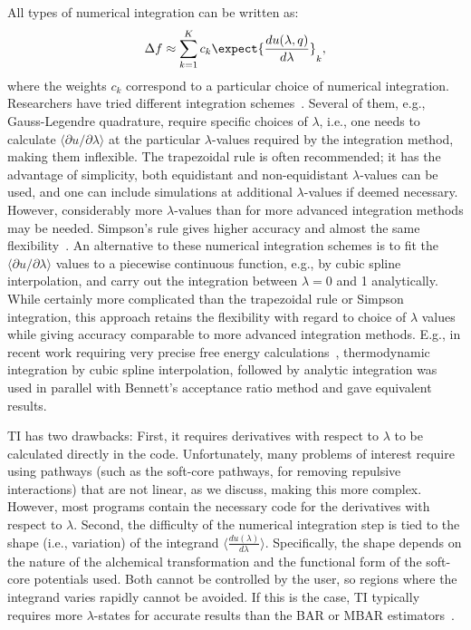 All types of numerical integration can be written as:
\[ \Delta f \approx \sum_{k=1}^{K} c_k
\expect{\frac{du(\lambda,q)}{d\lambda}}_{k}, \] where the weights $c_k$ correspond to a particular choice of numerical integration.
Researchers have tried different integration schemes~\cite{resat1993studies,jorge2010effect,shyu2009reducing,Bruckner2010}. Several of them, e.g., Gauss-Legendre quadrature, require specific choices of $\lambda$, i.e., one needs to calculate $\langle\partial u/\partial \lambda\rangle$ at the particular $\lambda$-values required by the integration method, making them inflexible. The trapezoidal rule is often recommended; it has the advantage of simplicity, both equidistant and non-equidistant $\lambda$-values can be used, and one can include simulations at additional $\lambda$-values if deemed necessary. However, considerably more $\lambda$-values than for more advanced integration methods may be needed. Simpson's rule gives higher accuracy and almost the same flexibility~\cite{Bruckner2010}. An alternative to these numerical integration schemes is to fit the  $\langle\partial u/\partial \lambda\rangle$ values to a piecewise continuous function, e.g., by cubic spline interpolation, and carry out the integration between $\lambda=0$ and 1 analytically. While certainly more complicated than the trapezoidal rule or Simpson integration,  this approach retains the flexibility with regard to choice of $\lambda$ values while giving accuracy comparable to more advanced integration methods. E.g., in recent work requiring very precise free energy calculations~\cite{Fleck_2021}, thermodynamic integration by cubic spline interpolation, followed by analytic integration  was used in parallel with Bennett's acceptance ratio method and gave equivalent results.

TI has two drawbacks: First, it requires derivatives with respect to $\lambda$ to be calculated directly in the code. Unfortunately, many problems of interest require using pathways (such as the soft-core pathways, for removing repulsive interactions) that are not linear, as we discuss, making this more complex. However, most programs contain the necessary code for the derivatives with respect to $\lambda$. Second, the difficulty of the numerical integration step is tied to the shape (i.e., variation) of the integrand $\langle\frac{du(\lambda)}{d\lambda}\rangle$. Specifically, the shape depends on the nature of the alchemical transformation and the functional form of the soft-core potentials used. Both cannot be controlled by the user, so regions where the integrand varies rapidly cannot be avoided. If this is the case, TI typically requires more $\lambda$-states for accurate results than the BAR or MBAR estimators~\cite{Bruckner2010}.

